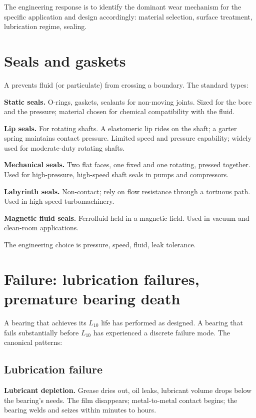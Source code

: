 The engineering response is to identify the dominant wear mechanism for the specific application and design accordingly: material selection, surface treatment, lubrication regime, sealing.

\section{Seals and gaskets}

A  prevents fluid (or particulate) from crossing a boundary. The standard types:

\textbf{Static seals.} O-rings, gaskets, sealants for non-moving joints. Sized for the bore and the pressure; material chosen for chemical compatibility with the fluid.

\textbf{Lip seals.} For rotating shafts. A elastomeric lip rides on the shaft; a garter spring maintains contact pressure. Limited speed and pressure capability; widely used for moderate-duty rotating shafts.

\textbf{Mechanical seals.} Two flat faces, one fixed and one rotating, pressed together. Used for high-pressure, high-speed shaft seals in pumps and compressors.

\textbf{Labyrinth seals.} Non-contact; rely on flow resistance through a tortuous path. Used in high-speed turbomachinery.

\textbf{Magnetic fluid seals.} Ferrofluid held in a magnetic field. Used in vacuum and clean-room applications.

The engineering choice is pressure, speed, fluid, leak tolerance.

\section{Failure: lubrication failures, premature bearing death}

A bearing that achieves its $L_{10}$ life has performed as designed. A bearing that fails substantially before $L_{10}$ has experienced a discrete failure mode. The canonical patterns:

\subsection{Lubrication failure}

\textbf{Lubricant depletion.} Grease dries out, oil leaks, lubricant volume drops below the bearing's needs. The film disappears; metal-to-metal contact begins; the bearing welds and seizes within minutes to hours.

